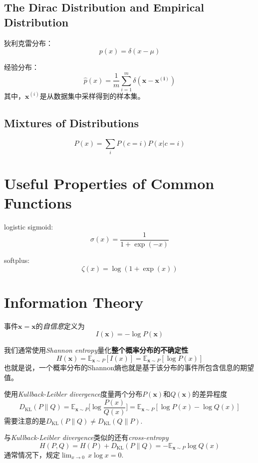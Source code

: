 \subsection{The Dirac Distribution and Empirical Distribution}

狄利克雷分布：
\begin{equation}
p(x)=\delta(x-\mu)
\end{equation}

经验分布：
\begin{equation}
\hat p(x)=\frac{1}{m}\sum_{i=1}^m\delta(\bm{x-x^{(i)}})
\end{equation}
其中，$\bm x^{(i)}$是从数据集中采样得到的样本集。

\subsection{Mixtures of Distributions}

\begin{equation}
P(x)=\sum_iP(c=i)P(x|c=i)
\end{equation}

\section{Useful Properties of Common Functions}

logistic sigmoid:
\begin{equation}
\sigma(x)=\frac{1}{1+\exp(-x)}
\end{equation}

softplus:
\begin{equation}
\zeta(x)=\log(1+\exp(x))
\end{equation}

\setcounter{section}{12}
\section{Information Theory}

事件$\mathbf x =\bm x$的\textit{自信息}定义为
\begin{equation}
I(\bm x)=-\log P(\bm x)
\end{equation}

我们通常使用\textit{Shannon entropy}量化\textbf{整个概率分布的不确定性}
\begin{equation}
    H(\mathbf x)=\mathbb E_{\mathbf x\sim P}[I(x)]=\mathbb E_{\mathbf x\sim P}[\log P(x)]
\end{equation}
也就是说，一个概率分布的Shannon熵也就是基于该分布的事件所包含信息的期望值。

使用\textit{Kullback-Leibler divergence}度量两个分布$P(\mathbf x)$和$Q(\mathbf x)$的差异程度
\begin{equation}
D_{\text{KL}}(P\|Q)=\mathbb E_{\mathbf x\sim P}\Big[\log\frac{P(x)}{Q(x)}\Big]=
    \mathbb E_{\mathbf x\sim P}[\log P(x)-\log Q(x)]\end{equation}
需要注意的是$D_{\text{KL}}(P\|Q)\ne D_{\text{KL}}(Q\|P)$.

与\textit{Kullback-Leibler divergence}类似的还有\textit{cross-entropy}
\begin{equation}
    H(P,Q)=H(P)+D_{\text{KL}}(P\|Q)=-\mathbb E_{\mathbf x\sim P}\log Q(x)
\end{equation}
通常情况下，规定$\lim_{x\to 0}\,x\log x=0$.
